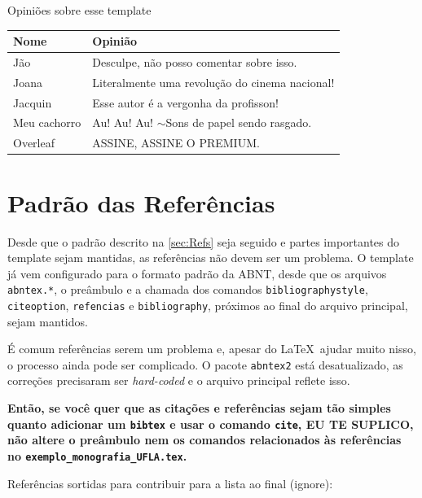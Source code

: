 \begin{quadro}[h]
\centering
\caption{Opiniões sobre esse template}\label{quad:exemplo}
  \begin{tabular}{|l|p{9cm}|}
    \hline 
    \rowcolor[gray]{.9}
    \bf Nome& \bf Opinião\\
    \hline
    Jão& Desculpe, não posso comentar sobre isso.\\
    \hline
    Joana& Literalmente uma revolução do cinema nacional!\\
    \hline
    Jacquin& Esse autor é a vergonha da profisson!\\
    \hline
    Meu cachorro& Au! Au! Au! $\sim$Sons de papel sendo rasgado.\\
    \hline
    Overleaf& ASSINE, ASSINE O PREMIUM.\\
    \hline
    \end{tabular}
    
    \vspace{0.3cm}
\end{quadro}


\section{Padrão das Referências}

Desde que o padrão descrito na \autoref{sec:Refs} seja seguido e partes importantes do template sejam mantidas, as referências não devem ser um problema. O template já vem configurado para o formato padrão da ABNT, desde que os arquivos \texttt{abntex.*}, o preâmbulo e a chamada dos comandos \texttt{bibliographystyle}, \texttt{citeoption}, \texttt{refencias} e \texttt{bibliography}, próximos ao final do arquivo principal, sejam mantidos.

É comum referências serem um problema e, apesar do \LaTeX\ ajudar muito nisso, o processo ainda pode ser complicado. O pacote \texttt{abntex2} está desatualizado, as correções precisaram ser \emph{hard-coded} e o arquivo principal reflete isso.

\textbf{Então, se você quer que as citações e referências sejam tão simples quanto adicionar um \texttt{bibtex} e usar o comando \texttt{cite}, EU TE SUPLICO, não altere o preâmbulo nem os comandos relacionados às referências no \texttt{exemplo\_monografia\_UFLA.tex}.}

Referências sortidas para contribuir para a lista ao final (ignore): \cite{Eco1996,Booth2000,BIB2010,Hexsel2004,Franca2001,Gil2002,Porto2002,Silva2005,UFLA:2015,Moura1998,NBR6023:2002}


